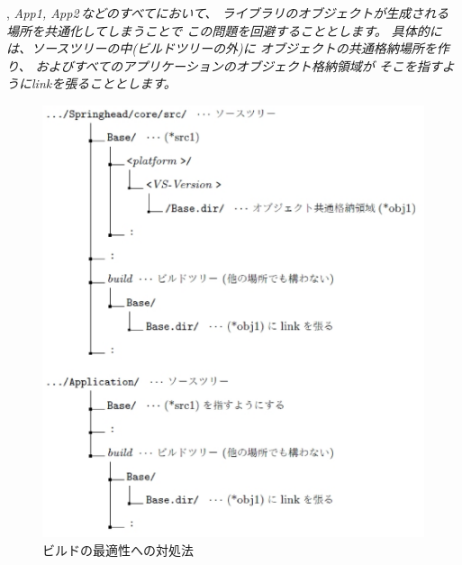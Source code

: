 \begin{narrow}[20pt]
	\SprLib, \it{App1, App2\,}\KLUDGE などのすべてにおいて、
	\KLUDGE ライブラリのオブジェクトが生成される場所を共通化してしまうことで
	\KLUDGE この問題を回避することとします。
	\KLUDGE 具体的には、\SprLib \KLUDGE ソースツリーの中(\KLUDGE ビルドツリーの外)\KLUDGE に
	\KLUDGE オブジェクトの共通格納場所を作り、
	\SprLib \KLUDGE およびすべてのアプリケーションのオブジェクト格納領域が
	\KLUDGE そこを指すようにlink\KLUDGE を張ることとします。

\ifLwarp
	\begin{figure}[h]
	    \begin{center}
	    \includegraphics[width=.9\textwidth]{fig/ApproachToBuildOptimization.eps}
	    \end{center}
	    \caption{\KLUDGE ビルドの最適性への対処法}
	    \label{fig:ApproachToBuildOptimization}
	\end{figure}
\else
	\begin{figure}[h]
    	\begin{narrow}[40pt]\begin{minipage}{\textwidth}
		{\footnotesize{}}
\end{minipage}
\end{narrow}
\end{figure}
\end{narrow}
